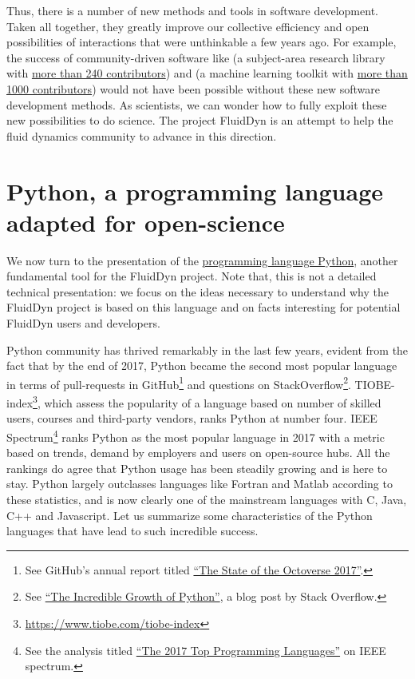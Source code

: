 Thus, there is a number of new methods and tools in software development.
Taken all together, they greatly improve our collective efficiency and
open possibilities of interactions that were unthinkable a few years ago.
%
For example, the success of community-driven software like  (a
subject-area research library with
\href{https://github.com/astropy/astropy}{more than 240 contributors}) and
 (a machine learning toolkit with
\href{https://github.com/scikit-learn/scikit-learn}{more than 1000
contributors}) would not have been possible without these new software
development methods.
%
%
As scientists, we can wonder how to fully exploit these new possibilities to do
science.  The project FluidDyn is an attempt to help the fluid dynamics
community to advance in this direction.


\section{Python, a programming language adapted for open-science}

We now turn to the presentation of the
\href{https://www.python.org/}{programming language Python}, another
fundamental tool for the FluidDyn project.  Note that, this is not a detailed
technical presentation: we focus on the ideas necessary to understand why the
FluidDyn project is based on this language and on facts interesting for
potential FluidDyn users and developers.

Python community has thrived remarkably in the last few years, evident from the
fact that by the end of 2017, Python became the second most popular language in
terms of pull-requests in GitHub\footnote{See GitHub's annual report titled
\href{https://octoverse.github.com/}{ ``The State of the Octoverse 2017''}.} and
questions on StackOverflow\footnote{See
\href{https://stackoverflow.blog/2017/09/06/incredible-growth-python/}{ ``The
Incredible Growth of Python''}, a blog post by Stack Overflow.}.
%
TIOBE-index\footnote{\url{https://www.tiobe.com/tiobe-index}}, which assess the
popularity of a language based on number of skilled users, courses and
third-party vendors, ranks Python at number four. IEEE Spectrum\footnote{See
the analysis titled \href{https://spectrum.ieee.org/computing/software/%
the-2017-top-programming-languages}{``The 2017 Top Programming Languages''} on
IEEE spectrum.} ranks Python as the most popular language in 2017 with a metric
based on trends, demand by employers and users on open-source hubs.  All the
rankings do agree that Python usage has been steadily growing and is here to
stay.  Python largely outclasses languages like Fortran and Matlab according to
these statistics, and is now clearly one of the mainstream languages with C,
Java, C++ and Javascript.
%
Let us summarize some characteristics of the Python languages that have lead to
such incredible success.

